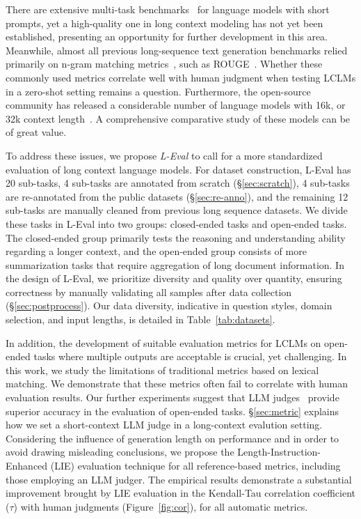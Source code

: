 There are extensive multi-task benchmarks~\citep{hendrycks2021measuring, suzgun2022challenging} for language models with short prompts, yet a high-quality one in long context modeling has not yet been established, presenting an opportunity for further development in this area.  Meanwhile, almost all previous long-sequence text generation benchmarks relied primarily on n-gram matching metrics~\citep{zhang2023cab, shaham2022scrolls}, such as ROUGE~\citep{lin-2004-rouge}. Whether these commonly used metrics correlate well with human judgment when testing LCLMs in a zero-shot setting remains a question. Furthermore, the open-source community has released a considerable number of language models with 16k, or 32k context length~\citep{longchat2023, du2022glm}. A comprehensive comparative study of these models can be of great value.

To address these issues, we propose \textit{L-Eval} to call for a more standardized evaluation of long context language models. For dataset construction, L-Eval has 20 sub-tasks, 4 sub-tasks are annotated from scratch (\S\ref{sec:scratch}), 4 sub-tasks are re-annotated from the public datasets (\S\ref{sec:re-anno}), and the remaining 12 sub-tasks are manually cleaned from previous long sequence datasets.  
We divide these tasks in L-Eval into two groups: closed-ended tasks and open-ended tasks. The closed-ended group primarily tests the reasoning and understanding ability regarding a longer context, and the open-ended group consists of more summarization tasks that require aggregation of long document information. In the design of L-Eval, we prioritize diversity and quality over quantity, ensuring correctness by manually validating all samples after data collection (\S\ref{sec:postprocess}). Our data diversity, indicative in question styles, domain selection, and input lengths, is detailed in Table~\ref{tab:datasets}.

In addition, the development of suitable evaluation metrics for LCLMs on open-ended tasks where multiple outputs are acceptable is crucial, yet challenging. In this work, we study the limitations of traditional metrics based on lexical matching. We demonstrate that these metrics often fail to correlate with human evaluation results. Our further experiments suggest that LLM judges~\citep{alpaca_eval, zheng2023judging} provide superior accuracy in the evaluation of open-ended tasks. \S\ref{sec:metric} explains how we set a short-context LLM judge in a long-context evalution setting. 
Considering the influence of generation length on performance and in order to avoid drawing misleading conclusions, we propose the Length-Instruction-Enhanced (LIE) evaluation technique for all reference-based metrics, including those employing an LLM judger. The empirical results demonstrate a substantial improvement brought by LIE evaluation in the Kendall-Tau correlation coefficient ($\tau$) with human judgments (Figure~\ref{fig:cor}), for all automatic metrics.

